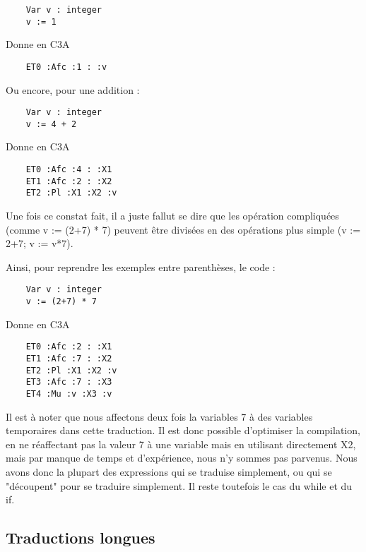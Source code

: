 \documentclass{article}
\begin{document}
\begin{lstlisting}
    Var v : integer
    v := 1
\end{lstlisting}

Donne en C3A

\begin{lstlisting}
    ET0 :Afc :1 : :v
\end{lstlisting}

Ou encore, pour une addition :

\begin{lstlisting}
    Var v : integer
    v := 4 + 2
\end{lstlisting}

Donne en C3A

\begin{lstlisting}
    ET0 :Afc :4 : :X1
    ET1 :Afc :2 : :X2
    ET2 :Pl :X1 :X2 :v
\end{lstlisting}

\bigbreak

Une fois ce constat fait, il a juste fallut se dire que les opération compliquées (comme v := (2+7) * 7) peuvent être divisées en des opérations plus simple (v := 2+7; v := v*7).

Ainsi, pour reprendre les exemples entre parenthèses, le code :

\begin{lstlisting}
    Var v : integer
    v := (2+7) * 7
\end{lstlisting}

Donne en C3A

\begin{lstlisting}
    ET0 :Afc :2 : :X1
    ET1 :Afc :7 : :X2
    ET2 :Pl :X1 :X2 :v
    ET3 :Afc :7 : :X3
    ET4 :Mu :v :X3 :v
\end{lstlisting}

Il est à noter que nous affectons deux fois la variables 7 à des variables temporaires dans cette traduction. Il est donc possible d'optimiser la compilation, en ne réaffectant pas la valeur 7 à une variable mais en utilisant directement X2, mais par manque de temps et d'expérience, nous n'y sommes pas parvenus.
\bigbreak
Nous avons donc la plupart des expressions qui se traduise simplement, ou qui se "découpent" pour se traduire simplement. Il reste toutefois le cas du while et du if.


\subsection{Traductions longues}
\end{document}
